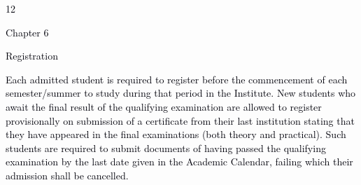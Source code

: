 \documentclass[12pt]{article}
\begin{document}
\vspace{\baselineskip}

\vspace{\baselineskip}

\vspace{\baselineskip}

\vspace{\baselineskip}

\vspace{\baselineskip}

\vspace{\baselineskip}

\vspace{\baselineskip}

\vspace{\baselineskip}

\vspace{\baselineskip}

\vspace{\baselineskip}

\vspace{\baselineskip}

\vspace{\baselineskip}
\begin{Center}
\textcolor[HTML]{00000A}{12}
\end{Center}\par


\vspace{\baselineskip}
{\fontsize{14pt}{16.8pt}\selectfont \textcolor[HTML]{00000A}{Chapter 6}\par}\par


\vspace{\baselineskip}
{\fontsize{20pt}{24.0pt}\selectfont \textcolor[HTML]{00000A}{Registration}\par}\par


\vspace{\baselineskip}
{\fontsize{9pt}{10.8pt}\selectfont \textcolor[HTML]{00000A}{Each admitted student is required to register before the commencement of each semester/summer to study during that period in the Institute. New students who await the final result of the qualifying examination are allowed to register provisionally on submission of a certificate from their last institution stating that they have appeared in the final examinations (both theory and practical). Such students are required to submit documents of having passed the qualifying examination by the last date given in the Academic Calendar, failing which their admission shall be cancelled.}\par}\par
\end{document}
